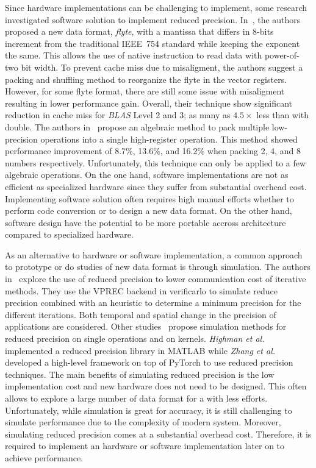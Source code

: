 Since hardware implementations can be challenging to implement, some research investigated
software solution to implement reduced precision.
In~\cite{Anderson2016-yn}, the authors proposed a new data format, \textit{flyte},
with a mantissa that differs in 8-bits increment from the traditional IEEE~754 
standard while keeping the exponent the same.
This allows the use of native instruction to read data with power-of-two bit width.
To prevent cache miss due to misaligment, the authors suggest a packing and shuffling
method to reorganize the flyte in the vector registers.
However, for some flyte format, there are still some issue with misaligment resulting
in lower performance gain.
Overall, their technique show significant reduction in cache miss for \textit{BLAS}
Level 2 and 3; as many as $4.5\times$ less than with double.
The authors in~\cite{Zucker1994-rg} propose an algebraic method to pack multiple
low-precision operations into a single high-register operation.
This method showed performance improvement of 8.7\%, 13.6\%, and 16.2\% when packing
2, 4, and 8 numbers respectively.
Unfortunately, this technique can only be applied to a few algebraic operations.
On the one hand, software implementations are not as efficient as specialized hardware
since they suffer from substantial overhead cost.
Implementing software solution often requires high manual efforts whether to  perform
code conversion or to design a new data format.
On the other hand, software design have the potential to be more portable accross
architecture compared to specialized hardware.

As an alternative to hardware or software implementation, a common approach to 
prototype or do studies of new data format is through simulation.
The authors in~\cite{Chatelain2019-fu} explore the use of reduced precision to 
lower communication cost of iterative methods.
They use the VPREC backend in verificarlo to simulate reduce precision combined
with an heuristic to determine a minimum precision for the different iterations.
Both temporal and spatial change in the precision of applications are considered.
Other studies~\cite{Higham2019-yd,Zhang2019-xv} propose simulation methods for reduced
precision on single operations and on kernels.
\textit{Highman et al.} implemented a reduced precision library in MATLAB while 
\textit{Zhang et al.} developed a high-level framework on top of PyTorch to use
reduced precision techniques.
The main benefits of simulating reduced precision is the low implementation cost 
and new hardware does not need to be designed.
This often allows to explore a large number of data format for a with less efforts.
Unfortunately, while simulation is great for accuracy, it is still challenging to 
simulate performance due to the complexity of modern system.
Moreover, simulating reduced precision comes at a substantial overhead cost.
Therefore, it is required to implement an hardware or software implementation later on to achieve performance.

